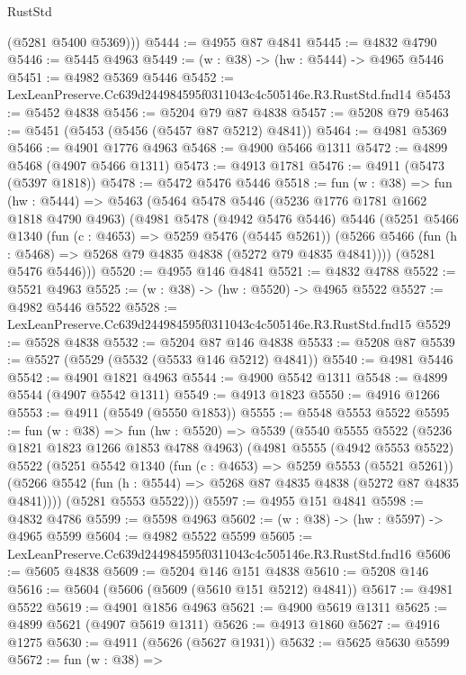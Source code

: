\begin{lexlean}{RustStd}
\begin{coremodule}
        (@5281 @5400 @5369)))
@5444 := @4955 @87 @4841
@5445 := @4832 @4790
@5446 := @5445 @4963
@5449 := (w : @38) -> (hw : @5444) -> @4965 @5446
@5451 := @4982 @5369 @5446
@5452 := LexLeanPreserve.Cc639d244984595f0311043c4c505146e.R3.RustStd.fnd14
@5453 := @5452 @4838
@5456 := @5204 @79 @87 @4838
@5457 := @5208 @79
@5463 := @5451 (@5453 (@5456 (@5457 @87 @5212) @4841))
@5464 := @4981 @5369
@5466 := @4901 @1776 @4963
@5468 := @4900 @5466 @1311
@5472 := @4899 @5468 (@4907 @5466 @1311)
@5473 := @4913 @1781
@5476 := @4911 (@5473 (@5397 @1818))
@5478 := @5472 @5476 @5446
@5518 := fun (w : @38) =>
  fun (hw : @5444) =>
  @5463
    (@5464
      @5478
      @5446
      (@5236 @1776 @1781 @1662 @1818 @4790 @4963)
      (@4981
        @5478
        (@4942 @5476 @5446)
        @5446
        (@5251
          @5466
          @1340
          (fun (c : @4653) => @5259 @5476 (@5445 @5261))
          (@5266 @5466 (fun (h : @5468) => @5268 @79 @4835 @4838 (@5272 @79 @4835 @4841))))
        (@5281 @5476 @5446)))
@5520 := @4955 @146 @4841
@5521 := @4832 @4788
@5522 := @5521 @4963
@5525 := (w : @38) -> (hw : @5520) -> @4965 @5522
@5527 := @4982 @5446 @5522
@5528 := LexLeanPreserve.Cc639d244984595f0311043c4c505146e.R3.RustStd.fnd15
@5529 := @5528 @4838
@5532 := @5204 @87 @146 @4838
@5533 := @5208 @87
@5539 := @5527 (@5529 (@5532 (@5533 @146 @5212) @4841))
@5540 := @4981 @5446
@5542 := @4901 @1821 @4963
@5544 := @4900 @5542 @1311
@5548 := @4899 @5544 (@4907 @5542 @1311)
@5549 := @4913 @1823
@5550 := @4916 @1266
@5553 := @4911 (@5549 (@5550 @1853))
@5555 := @5548 @5553 @5522
@5595 := fun (w : @38) =>
  fun (hw : @5520) =>
  @5539
    (@5540
      @5555
      @5522
      (@5236 @1821 @1823 @1266 @1853 @4788 @4963)
      (@4981
        @5555
        (@4942 @5553 @5522)
        @5522
        (@5251
          @5542
          @1340
          (fun (c : @4653) => @5259 @5553 (@5521 @5261))
          (@5266 @5542 (fun (h : @5544) => @5268 @87 @4835 @4838 (@5272 @87 @4835 @4841))))
        (@5281 @5553 @5522)))
@5597 := @4955 @151 @4841
@5598 := @4832 @4786
@5599 := @5598 @4963
@5602 := (w : @38) -> (hw : @5597) -> @4965 @5599
@5604 := @4982 @5522 @5599
@5605 := LexLeanPreserve.Cc639d244984595f0311043c4c505146e.R3.RustStd.fnd16
@5606 := @5605 @4838
@5609 := @5204 @146 @151 @4838
@5610 := @5208 @146
@5616 := @5604 (@5606 (@5609 (@5610 @151 @5212) @4841))
@5617 := @4981 @5522
@5619 := @4901 @1856 @4963
@5621 := @4900 @5619 @1311
@5625 := @4899 @5621 (@4907 @5619 @1311)
@5626 := @4913 @1860
@5627 := @4916 @1275
@5630 := @4911 (@5626 (@5627 @1931))
@5632 := @5625 @5630 @5599
@5672 := fun (w : @38) =>

\end{coremodule}
\end{lexlean}
